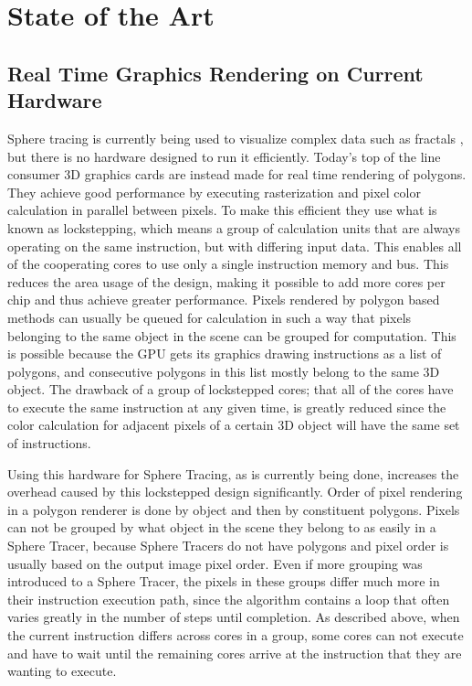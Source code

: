 \chapter{State of the Art}

	\section{ Real Time Graphics Rendering on Current Hardware } 

		Sphere tracing is currently being used to visualize complex data such as
		fractals \cite{granskog2017}, but there is no hardware designed to run
		it efficiently. Today's top of the line consumer 3D graphics cards are
		instead made for real time rendering of polygons\cite{Houston2010}. They
		achieve good performance by executing rasterization and pixel color
		calculation in parallel between pixels. To make this efficient they use
		what is known as lockstepping, which means a group of calculation units
		that are always operating on the same instruction, but with differing
		input data. This enables all of the cooperating cores to use only a
		single instruction memory and bus. This reduces the area usage of the
		design, making it possible to add more cores per chip and thus achieve
		greater performance. Pixels rendered by polygon based methods can
		usually be queued for calculation in such a way that pixels belonging to
		the same object in the scene can be grouped for computation. This is
		possible because the GPU gets its graphics drawing instructions as a
		list of polygons, and consecutive polygons in this list mostly belong to
		the same 3D object. The drawback of a group of lockstepped cores; that
		all of the cores have to execute the same instruction at any given time,
		is greatly reduced since the color calculation for adjacent pixels of a
		certain 3D object will have the same set of instructions.
		
		Using this hardware for Sphere Tracing, as is currently being done,
		increases the overhead caused by this lockstepped design significantly.
		Order of pixel rendering in a polygon renderer is done by object and
		then by constituent polygons. Pixels can not be grouped by what object
		in the scene they belong to as easily in a Sphere Tracer, because Sphere
		Tracers do not have polygons and pixel order is usually based on the
		output image pixel order. Even if more grouping was introduced to a
		Sphere Tracer, the pixels in these groups differ much more in their
		instruction execution path, since the algorithm contains a loop that
		often varies greatly in the number of steps until completion. As
		described above, when the current instruction differs across cores in a
		group, some cores can not execute and have to wait until the remaining
		cores arrive at the instruction that they are wanting to execute.
		
